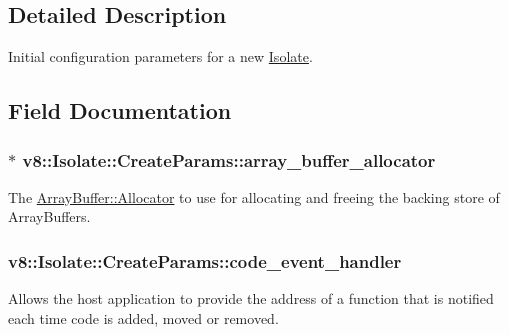 \subsection{Detailed Description}
Initial configuration parameters for a new \hyperlink{classv8_1_1Isolate}{Isolate}. 

\subsection{Field Documentation}
\hypertarget{structv8_1_1Isolate_1_1CreateParams_a7c663f70b64290392eeaf164f57585f9}{}
\subsubsection[{array\+\_\+buffer\+\_\+allocator}]{$\ast$ v8\+::\+Isolate\+::\+Create\+Params\+::array\+\_\+buffer\+\_\+allocator}\label{structv8_1_1Isolate_1_1CreateParams_a7c663f70b64290392eeaf164f57585f9}
The \hyperlink{classv8_1_1ArrayBuffer_1_1Allocator}{Array\+Buffer\+::\+Allocator} to use for allocating and freeing the backing store of Array\+Buffers. \hypertarget{structv8_1_1Isolate_1_1CreateParams_a783e3eba90ce6e2800bdd69197bbccdd}{}
\subsubsection[{code\+\_\+event\+\_\+handler}]{ v8\+::\+Isolate\+::\+Create\+Params\+::code\+\_\+event\+\_\+handler}\label{structv8_1_1Isolate_1_1CreateParams_a783e3eba90ce6e2800bdd69197bbccdd}
Allows the host application to provide the address of a function that is notified each time code is added, moved or removed. \hypertarget{structv8_1_1Isolate_1_1CreateParams_a2c570b306aa8c1c24cfe70e8eee50fa1}{}

